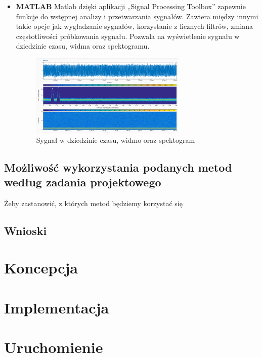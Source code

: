 \documentclass[a4paper,titleauthor]{mwart}
\begin{document}
\begin{itemize}
	\item \textbf{MATLAB} \newline\newline
	Matlab dzięki aplikacji „Signal Processing Toolbox” zapewnie funkcje do wstępnej analizy i przetwarzania sygnałów. Zawiera między innymi takie opcje jak wygładzanie sygnałów, korzystanie z licznych filtrów, zmiana częstotliwości próbkowania sygnału. \newline
	Pozwala na wyświetlenie sygnału w dziedzinie czasu, widma oraz spektogramu.\newline
	
	\begin{figure}[h]
		\centering
		\includegraphics[width=0.7\textwidth]{matlab1.PNG}
		\caption{Sygnał w dziedzinie czasu, widmo oraz spektogram}
	\end{figure}
	
\end{itemize}

\subsection{Możliwość wykorzystania podanych metod według zadania projektowego}

Żeby zastanowić, z których metod będziemy korzystać się


\subsection{Wnioski}

\section{Koncepcja}
\label{sec:koncepcja}

\section{Implementacja}
\label{sec:implementacja}


\section{Uruchomienie}
\label{sec:uruchomienie}
\end{document}
